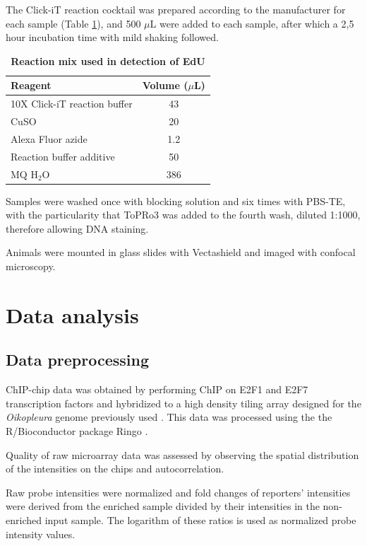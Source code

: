 \documentclass[11pt,twoside,a4paper]{report}
\begin{document}
			The Click-iT reaction cocktail was prepared according to the manufacturer for each sample (Table \ref{table:EdUmix}), and 500 $\mu$L were added to each sample, after which a 2,5 hour incubation time with mild shaking followed.

			\begin{table}[!h]
        		\caption{\bf{Reaction mix used in detection of EdU}}
        		\begin{center}
	        		\begin{tabular}{l|c}
		           		\textbf{Reagent} & \textbf{Volume ($\mu$L)}\\
	        		    \hline
		        		10X Click-iT reaction buffer & 43\\
						CuSO & 20\\
						Alexa Fluor azide & 1.2\\
						Reaction buffer additive & 50\\
						MQ H$_{2}$O & 386\\
	        		\end{tabular}
    		    \end{center}
	    	    \label{table:EdUmix}
		    \end{table}

			Samples were washed once with blocking solution and six times with PBS-TE, with the particularity that ToPRo3 was added to the fourth wash, diluted 1:1000, therefore allowing DNA staining.
		
			Animals were mounted in glass slides with Vectashield and imaged with confocal microscopy.
		
	\section{Data analysis}
		\subsection{Data preprocessing}
			ChIP-chip data was obtained by performing ChIP on E2F1 and E2F7 transcription factors and hybridized to a high density tiling array designed for the \textit{Oikopleura} genome previously used \cite{Danks2013}. This data was processed using the the R/Bioconductor package Ringo \cite{Toedling2007a}.
		
			Quality of raw microarray data was assessed by observing the spatial distribution of the intensities on the chips and autocorrelation.
		
			Raw probe intensities were normalized and fold changes of reporters' intensities were derived from the enriched sample divided by their intensities in the non-enriched input sample. The logarithm of these ratios is used as normalized probe intensity values.
		
\end{document}
